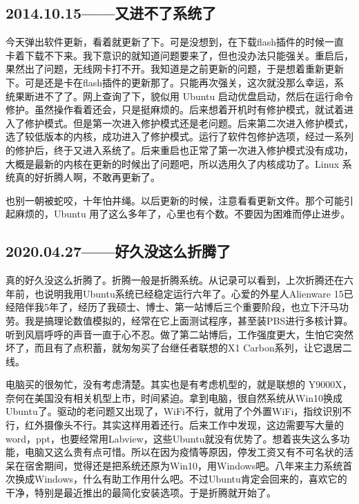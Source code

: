 \documentclass[cn,11pt,chinese,twoside]{elegantbook}
\begin{document}
\subsection*{2014.10.15——又进不了系统了}
今天弹出软件更新，看着就更新了下。可是没想到，在下载flash插件的时候一直卡着下载不下来。我下意识的就知道问题要来了，但也没办法只能强关。重启后，果然出了问题，无线网卡打不开。我知道是之前更新的问题，于是想着重新更新下。可是还是卡在flash插件的更新那了。只能再次强关，这次就没那么幸运，系统果断进不了了。网上查询了下，貌似用 Ubuntu  启动优盘启动，然后在运行命令修护。虽然操作看着还会，只是挺麻烦的。后来想着开机时有修护模式，就试着进入了修护模式。但是第一次进入修护模式还是老问题。后来第二次进入修护模式，选了较低版本的内核，成功进入了修护模式。运行了软件包修护选项，经过一系列的修护后，终于又进入系统了。后来重启也正常了第一次进入修护模式没有成功，大概是最新的内核在更新的时候出了问题吧，所以选用久了内核成功了。Linux 系统真的好折腾人啊，不敢再更新了。

也别一朝被蛇咬，十年怕井绳。以后更新的时候，注意看看更新文件。那个可能引起麻烦的，Ubuntu 用了这么多年了，心里也有个数。不要因为困难而停止进步。



\subsection*{2020.04.27——好久没这么折腾了}
真的好久没这么折腾了。折腾一般是折腾系统。从记录可以看到，上次折腾还在六年前，也说明我用Ubuntu系统已经稳定运行六年了。心爱的外星人Alienware 15已经陪伴我5年了，经历了我硕士、博士、第一站博后三个重要阶段，也立下汗马功劳。我是搞理论数值模拟的，经常在它上面测试程序，甚至装PBS进行多核计算。听到风扇呼呼的声音一直于心不忍。做了第二站博后，工作强度更大，生怕它突然坏了，而且有了点积蓄，就匆匆买了台继任者联想的X1 Carbon系列，让它退居二线。

电脑买的很匆忙，没有考虑清楚。其实也是有考虑机型的，就是联想的 Y9000X，奈何在美国没有相关机型上市，时间紧迫。拿到电脑，很自然系统从Win10换成Ubuntu了。驱动的老问题又出现了，WiFi不行，就用了个外置WiFi，指纹识别不行，红外摄像头不行。其实这样用着还行。后来工作中发现，这边需要写大量的word，ppt，也要经常用Labview，这些Ubuntu就没有优势了。想着丧失这么多功能，电脑又这么贵有点可惜。所以在因为疫情等原因，停发工资又有不可名状的活呆在宿舍期间，觉得还是把系统还原为Win10，用Windows吧。八年来主力系统首次换成Windows，什么有助工作用什么吧。不过Ubuntu肯定会回来的，喜欢它的干净，特别是最近推出的最简化安装选项。于是折腾就开始了。
\end{document}
